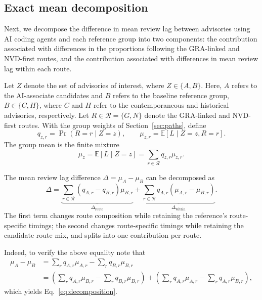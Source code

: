 \documentclass[smallextended,natbib]{svjour3}
\begin{document}
 

\subsection{Exact mean decomposition}
\label{sec:decomposition}

Next, we decompose the difference in mean review lag between advisories using AI 
coding agents and each reference group into two components: the contribution
associated with differences in the proportions following the GRA-linked and
NVD-first routes, and the contribution associated with differences in mean
review lag within each route. 

Let  $Z$ denote the set of advisories of interest, where $Z\in\{A,B\}$. Here,  $A$ refers to the  AI-associate  candidates and $B$ refers to the baseline reference group, $B\in\{C,H\}$, where $C$ and $H$ refer to the contemporaneous and historical advisories, respectively. Let $R\in\mathcal{R}=\{G,N\}$ denote the GRA-linked and NVD-first routes.
With the group weights of Section~\ref{sec:paths}, define
\begin{equation}
q_{z,r}=\Pr(R=r\mid Z=z),\qquad
\mu_{z,r}=\mathbb{E}[L\mid Z=z,R=r].
\label{eq:components}
\end{equation}
The group mean is the finite mixture
\begin{equation}
\mu_z=\mathbb{E}[L\mid Z=z]
=\sum_{r\in\mathcal{R}}q_{z,r}\mu_{z,r}.
\label{eq:mixture}
\end{equation}


The mean review lag difference $\Delta=\mu_A-\mu_B$ can be decomposed as
\begin{equation}
\Delta=
\underbrace{\sum_{r\in\mathcal{R}}
(q_{A,r}-q_{B,r})\mu_{B,r}}_{\Delta_{\mathrm{route}}}
+
\underbrace{\sum_{r\in\mathcal{R}}
q_{A,r}(\mu_{A,r}-\mu_{B,r})}_{\Delta_{\mathrm{within}}}.
\label{eq:decomposition}
\end{equation}
The first term changes route composition while retaining the reference's
route-specific timings; the second changes route-specific timings while
retaining the candidate route mix, and splits into one contribution per route.

Indeed, to verify the above equality note that 
\begin{align*}
\mu_A-\mu_B
&=\sum_r q_{A,r}\mu_{A,r}-\sum_r q_{B,r}\mu_{B,r}\\
&=\left(\sum_r q_{A,r}\mu_{B,r}-\sum_r q_{B,r}\mu_{B,r}\right)
 +\left(\sum_r q_{A,r}\mu_{A,r}-\sum_r q_{A,r}\mu_{B,r}\right),
\end{align*}
which yields Eq.~\ref{eq:decomposition}.
\end{document}
